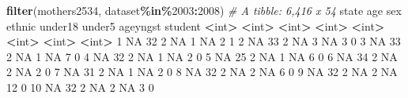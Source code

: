 \documentclass[
]{book}
\newenvironment{Shaded}{\begin{snugshade}}{\end{snugshade}}
\newcommand{\CommentTok}[1]{\textcolor[rgb]{0.56,0.35,0.01}{\textit{#1}}}
\newcommand{\ConstantTok}[1]{\textcolor[rgb]{0.56,0.35,0.01}{#1}}
\newcommand{\DecValTok}[1]{\textcolor[rgb]{0.00,0.00,0.81}{#1}}
\newcommand{\ErrorTok}[1]{\textcolor[rgb]{0.64,0.00,0.00}{\textbf{#1}}}
\newcommand{\FunctionTok}[1]{\textcolor[rgb]{0.13,0.29,0.53}{\textbf{#1}}}
\newcommand{\NormalTok}[1]{#1}
\newcommand{\SpecialCharTok}[1]{\textcolor[rgb]{0.81,0.36,0.00}{\textbf{#1}}}
\begin{document}
\begin{Shaded}
\begin{Highlighting}[]
\FunctionTok{filter}\NormalTok{(mothers2534, dataset}\SpecialCharTok{\%in\%}\DecValTok{2003}\SpecialCharTok{:}\DecValTok{2008}\NormalTok{)}
\CommentTok{\# A tibble: 6,416 x 54}
\NormalTok{   state   age   sex ethnic under18 under5 ageyngst student}
   \SpecialCharTok{\textless{}}\NormalTok{int}\SpecialCharTok{\textgreater{}} \ErrorTok{\textless{}}\NormalTok{int}\SpecialCharTok{\textgreater{}} \ErrorTok{\textless{}}\NormalTok{int}\SpecialCharTok{\textgreater{}}  \ErrorTok{\textless{}}\NormalTok{int}\SpecialCharTok{\textgreater{}}   \ErrorTok{\textless{}}\NormalTok{int}\SpecialCharTok{\textgreater{}}  \ErrorTok{\textless{}}\NormalTok{int}\SpecialCharTok{\textgreater{}}    \ErrorTok{\textless{}}\NormalTok{int}\SpecialCharTok{\textgreater{}}   \ErrorTok{\textless{}}\NormalTok{int}\SpecialCharTok{\textgreater{}}
 \DecValTok{1}    \ConstantTok{NA}    \DecValTok{32}     \DecValTok{2}     \ConstantTok{NA}       \DecValTok{1}     \ConstantTok{NA}        \DecValTok{2}       \DecValTok{1}
 \DecValTok{2}    \ConstantTok{NA}    \DecValTok{33}     \DecValTok{2}     \ConstantTok{NA}       \DecValTok{3}     \ConstantTok{NA}        \DecValTok{3}       \DecValTok{0}
 \DecValTok{3}    \ConstantTok{NA}    \DecValTok{33}     \DecValTok{2}     \ConstantTok{NA}       \DecValTok{1}     \ConstantTok{NA}        \DecValTok{7}       \DecValTok{0}
 \DecValTok{4}    \ConstantTok{NA}    \DecValTok{32}     \DecValTok{2}     \ConstantTok{NA}       \DecValTok{1}     \ConstantTok{NA}        \DecValTok{2}       \DecValTok{0}
 \DecValTok{5}    \ConstantTok{NA}    \DecValTok{25}     \DecValTok{2}     \ConstantTok{NA}       \DecValTok{1}     \ConstantTok{NA}        \DecValTok{6}       \DecValTok{0}
 \DecValTok{6}    \ConstantTok{NA}    \DecValTok{34}     \DecValTok{2}     \ConstantTok{NA}       \DecValTok{2}     \ConstantTok{NA}        \DecValTok{2}       \DecValTok{0}
 \DecValTok{7}    \ConstantTok{NA}    \DecValTok{31}     \DecValTok{2}     \ConstantTok{NA}       \DecValTok{1}     \ConstantTok{NA}        \DecValTok{2}       \DecValTok{0}
 \DecValTok{8}    \ConstantTok{NA}    \DecValTok{32}     \DecValTok{2}     \ConstantTok{NA}       \DecValTok{2}     \ConstantTok{NA}        \DecValTok{6}       \DecValTok{0}
 \DecValTok{9}    \ConstantTok{NA}    \DecValTok{32}     \DecValTok{2}     \ConstantTok{NA}       \DecValTok{2}     \ConstantTok{NA}       \DecValTok{12}       \DecValTok{0}
\DecValTok{10}    \ConstantTok{NA}    \DecValTok{32}     \DecValTok{2}     \ConstantTok{NA}       \DecValTok{2}     \ConstantTok{NA}        \DecValTok{3}       \DecValTok{0}

\end{Highlighting}
\end{Shaded}
\end{document}
